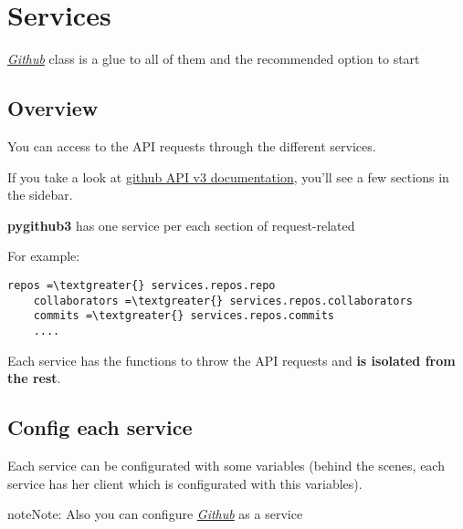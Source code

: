 \documentclass[letterpaper,10pt,english]{sphinxmanual}
\begin{document}
\section{Services}
\label{services:services}\label{services::doc}
{\hyperref[github::doc]{\emph{Github}}} class is a glue to all of them and the recommended option to
start


\subsection{Overview}
\label{services:overview}
You can access to the API requests through the different services.

If you take a look at
\href{http://developer.github.com/}{github API v3 documentation}, you'll see a
few sections in the sidebar.

\textbf{pygithub3} has one service per each section of request-related

For example:

\begin{Verbatim}[commandchars=\\\{\}]
repos =\textgreater{} services.repos.repo
    collaborators =\textgreater{} services.repos.collaborators
    commits =\textgreater{} services.repos.commits
    ....
\end{Verbatim}

Each service has the functions to throw the API requests and \textbf{is isolated
from the rest}.


\subsection{Config each service}
\label{services:config-each-service}\label{services:id1}
Each service can be configurated with some variables (behind the scenes, each
service has her client which is configurated with this variables).

\begin{notice}{note}{Note:}
Also you can configure {\hyperref[github::doc]{\emph{Github}}} as a service
\end{notice}
\end{document}
